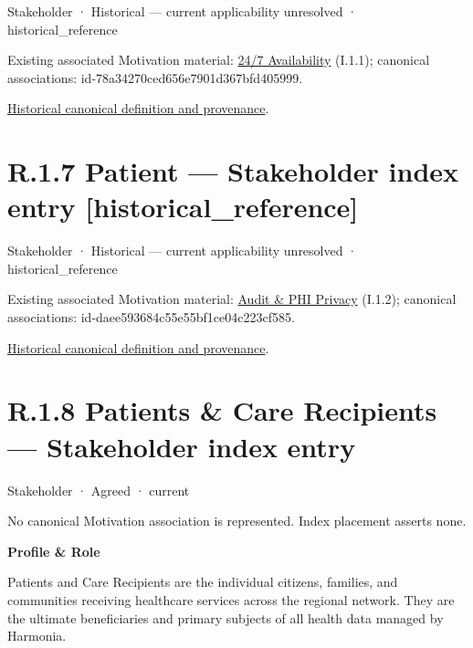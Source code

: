 \label{element:2018200a493d458096b72031cc2ae779}
{\small Stakeholder · Historical — current applicability unresolved · historical\_reference}\par
{\small Existing associated Motivation material: \hyperref[element:782f53e2190f4a8a8d0dc0a33cd6fbb3]{24/7 Availability} (I.1.1); canonical associations: id-78a34270ced656e7901d367bfd405999.}\par
\href{../../../../continuum/motivation/stakeholder/2018200a493d458096b72031cc2ae779.md}{Historical canonical definition and provenance}.\par
\section*{R.1.7 Patient — Stakeholder index entry [historical\_reference]}
\label{navigation:R.1.7}

\label{element:5f6d333e94634420b8a8bbf8b9cb6e2a}
{\small Stakeholder · Historical — current applicability unresolved · historical\_reference}\par
{\small Existing associated Motivation material: \hyperref[element:499313a0a5d84520a3061120ae9b6dac]{Audit \& PHI Privacy} (I.1.2); canonical associations: id-daee593684c55e55bf1ce04c223cf585.}\par
\href{../../../../continuum/motivation/stakeholder/5f6d333e94634420b8a8bbf8b9cb6e2a.md}{Historical canonical definition and provenance}.\par
\section*{R.1.8 Patients \& Care Recipients — Stakeholder index entry}
\label{navigation:R.1.8}

\label{element:ea5a315450ce4cfb87417263560c2b6d}
{\small Stakeholder · Agreed · current}\par
No canonical Motivation association is represented. Index placement asserts none.\par

\par\medskip\textbf{Profile \& Role}\par


Patients and Care Recipients are the individual citizens, families, and communities receiving healthcare services across the regional network. They are the ultimate beneficiaries and primary subjects of all health data managed by Harmonia.



